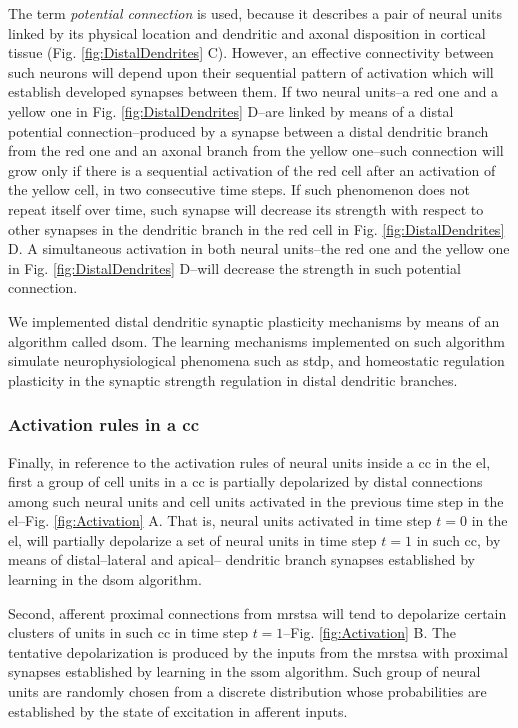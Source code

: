 \documentclass[10pt,letterpaper]{article}
\begin{document}
The term \emph{potential connection} is used, because it describes a pair of neural units linked by its physical location and dendritic and axonal disposition in cortical tissue (Fig. \ref{fig:DistalDendrites} C). However, an effective connectivity between such neurons will depend upon their sequential pattern of activation which will establish developed synapses between them. If two neural units--a red one and a yellow one in Fig. \ref{fig:DistalDendrites} D--are linked by means of a distal potential connection--produced by a synapse between a distal dendritic branch from the red one and an axonal branch from the yellow one--such connection will grow only if there is a sequential activation of the red cell after an activation of the yellow cell, in two consecutive time steps. If such phenomenon does not repeat itself over time, such synapse will decrease its strength with respect to other synapses in the dendritic branch in the red cell in Fig. \ref{fig:DistalDendrites} D. A simultaneous activation in both neural units--the red one and the yellow one in Fig. \ref{fig:DistalDendrites} D--will decrease the strength in such potential connection.

We implemented distal dendritic synaptic plasticity mechanisms by means of an algorithm called \gls{dsom}.
The learning mechanisms implemented on such algorithm simulate neurophysiological phenomena
such as \gls{stdp}, and homeostatic regulation plasticity in the synaptic strength regulation in
distal dendritic branches.







\subsubsection*{Activation rules in a \gls{cc}}

Finally, in reference to the activation rules of neural units inside a \gls{cc} in the \gls{el},
first a group of cell units in a \gls{cc} is partially depolarized 
by distal connections among such neural units and cell units activated in the
previous time step in the \gls{el}--Fig. \ref{fig:Activation} A.
That is, neural units activated in time step $t=0$ in the \gls{el}, will partially depolarize
a set of neural units in time step $t=1$ in such \gls{cc}, by means of distal--lateral and apical--
dendritic branch synapses established by learning in the \gls{dsom} algorithm.

Second, afferent proximal connections from \gls{mrstsa} will tend to depolarize
certain clusters of units in such \gls{cc} in time step $t=1$--Fig. \ref{fig:Activation} B.
The tentative depolarization is produced by the inputs from the \gls{mrstsa} with
proximal synapses established by learning in the \gls{ssom} algorithm. 
Such group of neural units are randomly chosen from a discrete distribution
whose probabilities are established by the state of excitation in afferent inputs.
\end{document}
